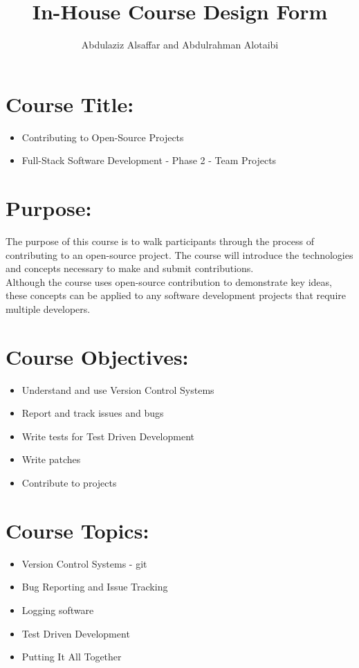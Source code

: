 \documentclass[a4paper,11pt]{article}
\author{Abdulaziz Alsa{f}far and Abdulrahman Alotaibi}
\title{In-House Course Design Form}
\begin{document}
\maketitle
\pagestyle{plain}
\setcounter{page}{1}

\section{Course Title:}
\begin{itemize}
	\item Contributing to Open-Source Projects
	\item Full-Stack Software Development - Phase 2 - Team Projects
\end{itemize}

\section{Purpose:}
The purpose of this course is to walk participants through the process of contributing to an open-source project.
The course will introduce the technologies and concepts necessary to make and submit contributions.\\
Although the course uses open-source contribution to demonstrate key ideas, these concepts can be applied to any software development projects that require multiple developers.

\section{Course Objectives:}
\begin{itemize}
	\item Understand and use Version Control Systems
	\item Report and track issues and bugs
	\item Write tests for Test Driven Development
	\item Write patches
	\item Contribute to projects
\end{itemize}

\section{Course Topics:}
\begin{itemize}
	\item Version Control Systems - git
	\item Bug Reporting and Issue Tracking
    \item Logging software
	\item Test Driven Development
	\item Putting It All Together
\end{itemize}
\end{document}
